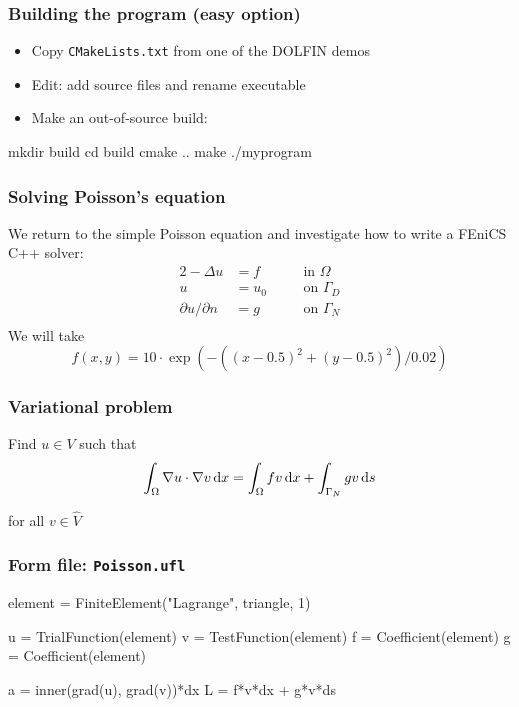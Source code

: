 \documentclass{fenicscourse}
\begin{document}
\begin{frame}[fragile]
  \frametitle{Building the program (easy option)}

  \begin{itemize}
  \item
    Copy \texttt{CMakeLists.txt} from one of the DOLFIN demos
  \item
    Edit: add source files and rename executable
  \item
    Make an out-of-source build:
  \end{itemize}

  \begin{c++}
mkdir build
cd build
cmake ..
make
./myprogram
  \end{c++}

\end{frame}

\begin{frame}
  \frametitle{Solving Poisson's equation}

  We return to the simple Poisson equation and investigate how
  to write a FEniCS C++ solver:
  \begin{alignat*}{2}
      - \Delta u &= f \,\,\, \quad &&\mbox{in } \Omega
      \\
    u &= u_0 \quad &&\mbox{on } \Gamma_D \\
    \partial u/\partial n &= g \quad &&\mbox{on } \Gamma_N \\
  \end{alignat*}
  We will take
  \begin{equation*}
    f(x, y) = 10\cdot\exp(-((x-0.5)^2 + (y-0.5)^2)/0.02)
  \end{equation*}

\end{frame}

\begin{frame}
  \frametitle{Variational problem}

  Find $u \in V$ such that
  \bigskip
  \begin{equation*}
    \int_{\Omega} \nabla u \cdot \nabla v \, \mathrm{d}x =
    \int_{\Omega} f v \, \mathrm{d}x + \int_{\Gamma_N} g v \, \mathrm{d}s
  \end{equation*}

  \bigskip
  for all $v \in \hat{V}$

\end{frame}

\begin{frame}[fragile]
  \frametitle{Form file: \texttt{Poisson.ufl}}

\begin{python}
element = FiniteElement("Lagrange", triangle, 1)

u = TrialFunction(element)
v = TestFunction(element)
f = Coefficient(element)
g = Coefficient(element)

a = inner(grad(u), grad(v))*dx
L = f*v*dx + g*v*ds
\end{python}

\end{frame}
\end{document}
